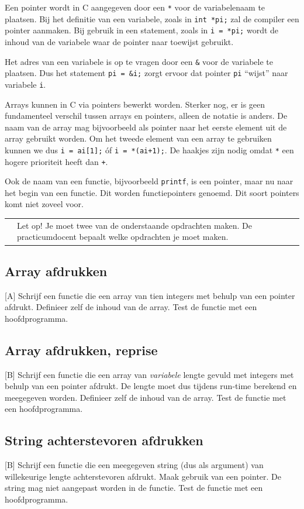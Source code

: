 \documentclass[a4paper,10pt,fleqn,twoside]{article}
\newcommand{\letop}{%
\vspace{4ex plus 1ex minus 1ex}
\begin{mdframed}[outerlinewidth = 1 ,%
roundcorner = 4 pt,%
leftmargin = 40,%
rightmargin = 40,%
backgroundcolor = yellow!40,%
outerlinecolor = red!70!black,%
innertopmargin = \topskip,%
splittopskip = \topskip,%
]
\begin{tabularx}{\linewidth}{m{1cm}X}
\Large\leftpointright & Let op! Je moet twee van de onderstaande opdrachten maken. De practicumdocent bepaalt welke opdrachten je moet maken.
\end{tabularx}
\end{mdframed}
\vspace{4ex plus 1ex minus 1ex}
}
\begin{document}
Een pointer wordt in C aangegeven door een \lstinline|*| voor de variabelenaam te plaatsen. Bij het definitie van een variabele, zoals in \lstinline|int *pi;| zal de compiler een pointer aanmaken. Bij gebruik in een statement, zoals in \lstinline|i = *pi;| wordt de inhoud van de variabele waar de pointer naar toewijst gebruikt. 

Het adres van een variabele is op te vragen door een \lstinline|&| voor de variabele te plaatsen. Dus het statement \lstinline|pi = &i;| zorgt ervoor dat pointer \lstinline|pi| ``wijst'' naar variabele \lstinline|i|.

Arrays kunnen in C via pointers bewerkt worden. Sterker nog, er is geen fundamenteel verschil tussen arrays en pointers, alleen de notatie is anders. De naam van de array mag bijvoorbeeld als pointer naar het eerste element uit de array gebruikt worden. Om het tweede element van een array te gebruiken kunnen we dus \lstinline|i = ai[1];| óf \lstinline|i = *(ai+1);|. De haakjes zijn nodig omdat \lstinline|*| een hogere prioriteit heeft dan \lstinline|+|.

Ook de naam van een functie, bijvoorbeeld \lstinline|printf|, is een pointer, maar nu naar het begin van een functie. Dit worden functiepointers genoemd. Dit soort pointers komt niet zoveel voor.

\letop

\subsection{Array afdrukken}[A]
Schrijf een functie die een array van tien integers met behulp van een pointer afdrukt. Definieer zelf de inhoud van de array. Test de functie met een hoofdprogramma.

\subsection{Array afdrukken, reprise}[B]
Schrijf een functie die een array van \textsl{variabele} lengte gevuld met integers met behulp van een pointer afdrukt. De lengte moet dus tijdens run-time berekend en meegegeven worden. Definieer zelf de inhoud van de array. Test de functie met een hoofdprogramma.

\subsection{String achterstevoren afdrukken}[B]
Schrijf een functie die een meegegeven string (dus als argument) van willekeurige lengte achterstevoren afdrukt. Maak gebruik van een pointer. De string mag niet aangepast worden in de functie. Test de functie met een hoofdprogramma.
\end{document}
